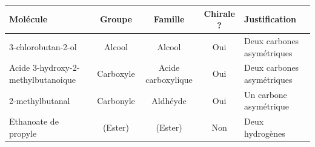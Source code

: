 \documentclass[a4paper,12pt]{article}
\begin{document}
\begin{table}[h]
    \centering
    \begin{tabularx}{\textwidth}{|X|c|c|c|X|}
    \hline
    \textbf{Molécule} & \textbf{Groupe} & \textbf{Famille} & \textbf{Chirale ?} & \textbf{Justification} \\
    \hline
    3-chlorobutan-2-ol                 & Alcool    & Alcool             & Oui & Deux carbones asymétriques \\
    \hline
    Acide 3-hydroxy-2-methylbutanoique & Carboxyle & Acide carboxylique & Oui & Deux carbones asymétriques \\
    \hline
    2-methylbutanal                    & Carbonyle & Aldhéyde           & Oui & Un carbone asymétrique \\
    \hline
    Ethanoate de propyle               & (Ester)   & (Ester)            & Non & Deux hydrogènes \\
    \hline
    \end{tabularx}
\end{table}
\end{document}
